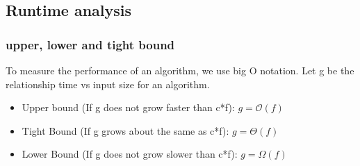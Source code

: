\subsection{Runtime analysis}
    \subsubsection{upper, lower and tight bound}
        To measure the performance of an algorithm, we use big O notation.
        Let g be the relationship time vs input size for an algorithm.
        
        \begin{itemize}
            \item Upper bound (If g does not grow faster than c*f):
            $g=\mathcal{O}(f)$
            \item Tight Bound (If g grows about the same as c*f):
            $g= \Theta(f)$
            \item Lower Bound (If g does not grow slower than c*f):
            $g= \Omega(f)$
        \end{itemize}
    

